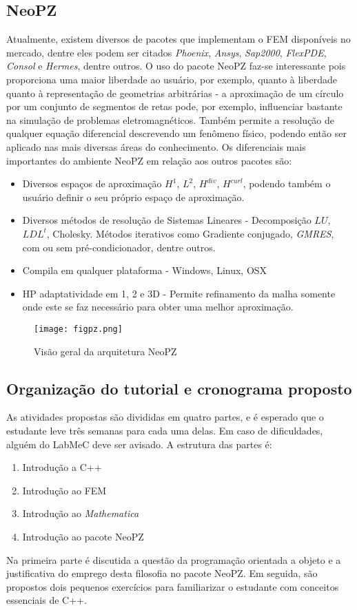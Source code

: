 \documentclass[11pt, oneside, hidelinks]{article}   	%
\begin{document}
\subsection{NeoPZ}
Atualmente, existem diversos de pacotes que implementam o FEM disponíveis no mercado, dentre eles podem ser citados \emph{Phoenix}, \emph{Ansys}, \emph{Sap2000}, \emph{FlexPDE}, \emph{Consol} e \emph{Hermes}, dentre outros. O uso do pacote NeoPZ faz-se interessante pois proporciona uma maior liberdade ao usuário, por exemplo, quanto à liberdade quanto à representação de geometrias arbitrárias - a aproximação de um círculo por um conjunto de segmentos de retas pode, por exemplo, influenciar bastante na simulação de problemas eletromagnéticos. Também permite a resolução de qualquer equação diferencial descrevendo um fenômeno físico, podendo então ser aplicado nas mais diversas áreas do conhecimento. Os diferenciais mais importantes do ambiente NeoPZ em relação aos outros pacotes são:
\begin{itemize}
\item Diversos espaços de aproximação  $H^{1}$, $L^{2}$, $H^{div}$, $H^{curl}$, podendo também o usuário definir o seu próprio espaço de aproximação.
\item Diversos métodos de resolução de Sistemas Lineares - Decomposição $LU$, $LDL^{t}$, Cholesky. Métodos iterativos como Gradiente conjugado, \emph{GMRES}, com ou sem pré-condicionador, dentre outros.
\item Compila em qualquer plataforma - Windows, Linux, OSX
\item HP adaptatividade em 1, 2 e 3D - Permite refinamento da malha somente onde este se faz necessário para obter uma melhor aproximação.
\end{itemize}

\begin{figure}[h!]
  \centering
      \texttt{[image: figpz.png]}
  \caption{Visão geral da arquitetura NeoPZ}
\end{figure}
\FloatBarrier
\subsection{Organização do tutorial e cronograma proposto}
As atividades propostas são divididas em quatro partes, e é esperado que o estudante leve três semanas para cada uma delas. Em caso de dificuldades, alguém do LabMeC deve ser avisado. A estrutura das partes é:
\begin{enumerate}
  \item Introdução a C++
  \item Introdução ao FEM
  \item Introdução ao \emph{Mathematica}
  \item Introdução ao pacote NeoPZ
\end{enumerate}
Na primeira parte é discutida a questão da programação orientada a objeto e a justificativa do emprego desta filosofia no pacote NeoPZ. Em seguida, são propostos dois pequenos exercícios para familiarizar o estudante com conceitos essenciais de C++.
\end{document}
